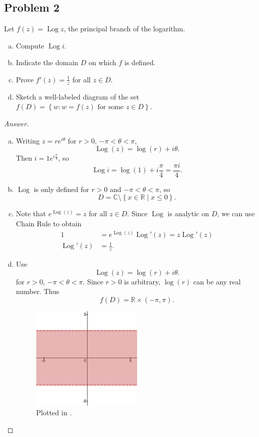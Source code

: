 \documentclass[12pt]{article}
\newcommand{\cx}{\mathbb{C}}
\newcommand{\real}{\mathbb{R}}
\newcommand\setb[1]{\left \{ #1 \right \}}
\theoremstyle{definition}
\DeclareMathOperator\Log{Log}
\begin{document}
\subsection{Problem 2}
Let $f(z) = \Log z$, the principal branch of the logarithm. 
\begin{enumerate}[a)]
    \item Compute $\Log i$.
    \item Indicate the domain $D$ on which $f$ is defined.
    \item Prove $\displaystyle f'(z) = \frac{1}{z}$ for all $z \in D$.
    \item Sketch a well-labeled diagram of the set $f(D) = \setb{ w : w = f(z) \text{ for some } z \in D }$. 
\end{enumerate}
\begin{proof}[Answer]
    \noindent
    \begin{enumerate}[a)]
        \item Writing $z = re^{i \theta}$ for $r > 0$, $-\pi < \theta < \pi$,
        \[
            \Log(z) = \log(r) + i \theta.
        \]
        Then $i = 1 e^{i \frac{\pi}{4}}$, so 
        \[
            \Log i = \log(1) + i \frac{\pi}{4} = \boxed{ \frac{\pi i}{4} . }
        \]
        \item $\Log$ is only defined for $r > 0$ and $-\pi < \theta < \pi$, so 
        \[
            D = \cx \setminus \setb{ x \in \real \mid x \leq 0 }.
        \]
        \item Note that $e^{\Log(z)} = z$ for all $z \in D$. Since $\Log$ is analytic on $D$, we can use Chain Rule to obtain 
        \begin{align*}
            1 & = e^{\Log(z)}\Log'(z) = z \Log'(z) \\
            \Log'(z) & = \frac{1}{z}.
        \end{align*}
        \item Use
        \[
            \Log(z) = \log(r) + i \theta.
        \]
        for $r > 0$, $-\pi < \theta < \pi$. Since $r > 0$ is arbitrary, $\log(r)$ can be any real number. Thus 
        \[
            f(D) = \real \times (-\pi , \pi).
        \]
        \begin{figure}[H]
            \centering
            \includegraphics[width = 0.5\textwidth]{2.png}
            \caption{Plotted in \cite{Desmos}.}
            \label{fig:fig3}
        \end{figure}
    \end{enumerate}
\end{proof}
\end{document}
